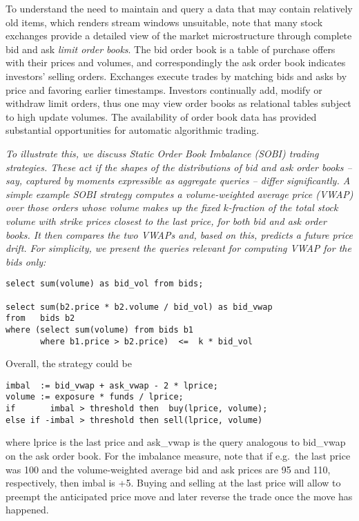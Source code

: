 To understand the need to maintain and query a data that may contain relatively old items, which renders stream windows unsuitable, note that
many stock exchanges provide a detailed view of the market microstructure
through complete bid and ask {\em limit order books}. The bid order book is a
table of purchase offers with their prices and volumes, and correspondingly the
ask order book indicates investors' selling orders. Exchanges execute trades by
matching bids and asks by price and favoring earlier timestamps. Investors
continually add, modify or withdraw limit orders, thus one may view order books
as relational tables subject to high update volumes. The availability of order
book data has provided substantial opportunities for automatic algorithmic
trading.



\begin{example}\em
To illustrate this, we discuss Static Order Book Imbalance (SOBI) trading
strategies. These act if the shapes of the distributions of bid and ask
order books -- say, captured by moments expressible as aggregate queries --
differ significantly. A simple example SOBI strategy \cite{sobi-kearns}
computes a volume-weighted average price (VWAP) over those
orders whose volume makes up the fixed $k$-fraction of the total stock volume
with strike prices closest to the last price, for both
bid and ask order books. It then compares the two VWAPs and, based on
this, predicts a future price drift.
For simplicity, we present the queries relevant for computing
VWAP for the bids only:
\begin{verbatim}
select sum(volume) as bid_vol from bids;

select sum(b2.price * b2.volume / bid_vol) as bid_vwap
from   bids b2
where (select sum(volume) from bids b1
       where b1.price > b2.price)  <=  k * bid_vol
\end{verbatim}
Overall, the strategy could be
\begin{verbatim}
imbal  := bid_vwap + ask_vwap - 2 * lprice;
volume := exposure * funds / lprice;
if       imbal > threshold then  buy(lprice, volume);
else if -imbal > threshold then sell(lprice, volume)
\end{verbatim}
where lprice is the last price and
ask\_vwap is the query analogous to bid\_vwap
on the ask order book.
For the imbalance measure, note that if e.g.\ the last price was 100 and
the volume-weighted average bid and ask prices are 95 and 110, respectively,
then imbal is +5.
Buying and selling at the last price will allow to preempt the
anticipated price move and later reverse the trade once the
move has happened.


\end{example}
